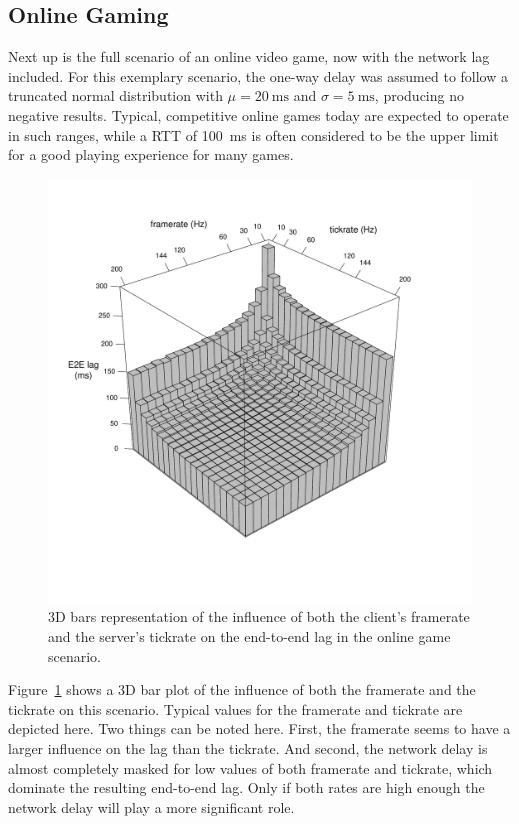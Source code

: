\subsection{Online Gaming}

Next up is the full scenario of an online video game, now with the network lag included. For this exemplary scenario, the one-way delay was assumed to follow a truncated normal distribution with $\mu = \SI{20}{\milli\second}$ and $\sigma = \SI{5}{\milli\second}$, producing no negative results. Typical, competitive online games today are expected to operate in such ranges, while a \acrshort{RTT} of \SI{100}{\milli\second} is often considered to be the upper limit for a good playing experience for many games.

\begin{figure}[!t]
	\centering
	\includegraphics[width=1.0\columnwidth]{../simulation/visualization/e2e-lag-3dbars.pdf}
	\vspace{-15mm}
	\caption{3D bars representation of the influence of both the client's framerate and the server's tickrate on the end-to-end lag in the online game scenario.}
\label{fig:3dbars-framerate-tickrate-lag}
\end{figure}

Figure~\ref{fig:3dbars-framerate-tickrate-lag} shows a 3D bar plot of the influence of both the framerate and the tickrate on this scenario. Typical values for the framerate and tickrate are depicted here. Two things can be noted here. First, the framerate seems to have a larger influence on the lag than the tickrate. And second, the network delay is almost completely masked for low values of both framerate and tickrate, which dominate the resulting end-to-end lag. Only if both rates are high enough the network delay will play a more significant role.

